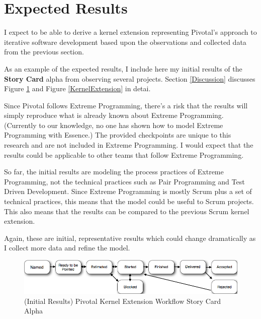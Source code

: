 \documentclass[preprint,12pt,3p]{elsarticle}
\begin{document}
\section{Expected Results}
\label{ExpectedResults}

I expect to be able to derive a kernel extension representing Pivotal's approach to iterative software development based upon the  observations and collected data from the previous section.

As an example of the expected results, I include here my initial results of the \textbf{Story Card} alpha from observing several projects. Section \ref{Discussion} discusses Figure \ref{KernelExtensionWorkflow} and Figure \ref{KernelExtension} in detai.

Since Pivotal follows Extreme Programming, there's a risk that the results will simply reproduce what is already known about Extreme Programming. (Currently to our knowledge, no one has shown how to model Extreme Programming with Essence.) The provided checkpoints are unique to this research and are not included in Extreme Programming. I would expect that the results could be applicable to other teams that follow Extreme Programming. 

So far, the initial results are modeling the process practices of Extreme Programming, not the technical practices such as Pair Programming and Test Driven Development. Since Extreme Programming is mostly Scrum plus a set of technical practices, this means that the model could be useful to Scrum projects. This also means that the results can be compared to the previous Scrum kernel extension.

Again, these are initial, representative results which could change dramatically as I collect more data and refine the model.

\begin{figure}[ht]
\includegraphics[width=6.25in]{pivotal_images/story_card_workflow}
\caption{(Initial Results) Pivotal Kernel Extension Workflow Story Card Alpha}
\label{KernelExtensionWorkflow}
\end{figure}
\end{document}
